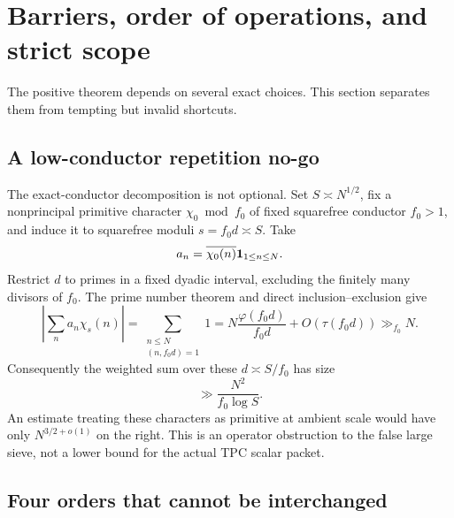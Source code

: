 \section{Barriers, order of operations, and strict scope}
\label{sec:barriers-scope}

The positive theorem depends on several exact choices.  This section
separates them from tempting but invalid shortcuts.

\subsection{A low-conductor repetition no-go}

The exact-conductor decomposition is not optional.  Set
\(S\asymp N^{1/2}\), fix a nonprincipal primitive character
\(\chi_0\bmod f_0\) of fixed squarefree conductor \(f_0>1\), and
induce it to squarefree moduli \(s=f_0d\asymp S\).  Take
\[
 a_n=\overline{\chi_0(n)}\mathbf 1_{1\le n\le N}.
\]
Restrict \(d\) to primes in a fixed dyadic interval, excluding the
finitely many divisors of \(f_0\).  The prime number theorem and direct
inclusion--exclusion give
\[
 \left|\sum_na_n\chi_s(n)\right|
 =\sum_{\substack{n\le N\\(n,f_0d)=1}}1
 =N\frac{\varphi(f_0d)}{f_0d}+O(\tau(f_0d))
 \gg_{f_0}N.
\]
Consequently the weighted sum over these \(d\asymp S/f_0\) has size
\begin{equation}
 \gg \frac{N^2}{f_0\log S}.
 \label{eq:induced-repetition-lower}
\end{equation}
An estimate treating these characters as primitive at ambient scale
would have only \(N^{3/2+o(1)}\) on the
right.  This is an operator obstruction to the false large sieve, not a
lower bound for the actual TPC scalar packet.

\subsection{Four orders that cannot be interchanged}

